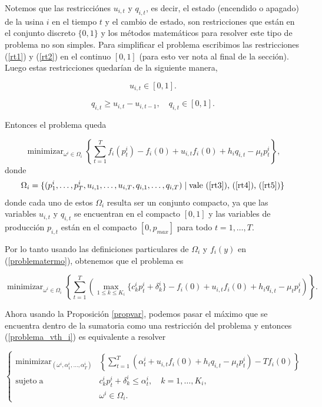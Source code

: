 \documentclass[a4paper,12pt]{report}
\newcommand{\om}{\omega}
\begin{document}
Notemos que las restricci\'ones $u_{i,t}$ y $q_{i,t}$, es decir, el estado (encendido o apagado) de la usina $i$ en el tiempo $t$ y el cambio de estado, son restricciones que est\'an en el conjunto discreto $\{0,1\}$ y los m\'etodos matem\'aticos para resolver este tipo de problema no son simples. Para simplificar el problema escribimos las restricciones (\ref{rt1}) y (\ref{rt2}) en el continuo $[0,1]$ (para esto ver nota al final de la secci\'on). Luego estas restricciones quedar\'ian de la siguiente manera,

\begin{equation}\label{rt4}
u_{i,t}\in[0,1].
\end{equation}

\begin{equation}\label{rt5}
 q_{i,t}\geq u_{i,t} - u_{i,t-1},\quad q_{i,t}\in[0,1].
\end{equation}


Entonces el problema queda

\begin{equation}\label{problematermo}
\displaystyle{\mathop{\mathrm{minimizar}}_{\om^i\in\Omega_i}\left\{\sum_{t=1}^T f_i(p_t^i)-f_i(0)+u_{i,t}f_i(0)+h_iq_{i,t}-\mu_t p_t^i\right\}},
\end{equation}
donde
$$\Omega_i=\{(p_1^i,\ldots,p_T^i,u_{i,1},\ldots,u_{i,T},q_{i,1},\ldots,q_{i,T})\mid \mbox{vale (\ref{rt3}), (\ref{rt4}), (\ref{rt5})}\}$$
donde cada uno de estos $\Omega_i$ resulta ser un conjunto compacto, ya que las variables $u_{i,t}$ y $q_{i,t}$ se encuentran en el compacto $[0,1]$ y las variables de producci\'on $p_{i,t}$ est\'an en el compacto $[0,p_{max}]$ para todo $t=1,\ldots,T$.


Por lo tanto usando las definiciones particulares de $\Omega_i$ y $f_i(y)$ en (\ref{problematermo}), obtenemos que el problema es

$$\mathop{\mathrm{minimizar}}_{\om^i\in\Omega_i}\left\{\sum_{t=1}^T\left(\max_{1\leq k\leq K_i}\{c_k^i p_t^i+\delta_k^i\} -f_i(0)+u_{i,t}f_i(0)+h_i q_{i,t}-\mu_t p_t^i\right)\right\}.$$


Ahora usando la Proposici\'on \ref{propvar}, podemos pasar el m\'aximo que se encuentra dentro de la sumatoria como una restricci\'on del problema y entonces (\ref{problema_vth_i}) es equivalente a resolver

\begin{equation}\label{problematermo2}
\left\{
 \begin{array}{rl}
  \displaystyle{\mathop{\mathrm{minimizar}}_{(\om^i,\alpha_1^i,\ldots,\alpha_T^i)}}&\left\{\sum_{t=1}^T\left(\alpha_t^i+u_{i,t}f_i(0)+h_i q_{i,t}-\mu_t p_t^i\right)-Tf_i(0)\right\}\\
  \mathrm{sujeto\;a}&c_k^i p_t^i+\delta_k^i\leq\alpha_t^i, \quad k=1,\ldots,K_i,\\
&  \om^i\in\Omega_i.
 \end{array}
\right.
\end{equation}
\end{document}

